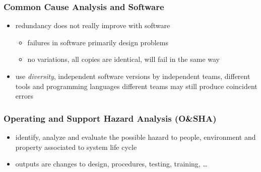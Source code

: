 \documentclass[a4paper, 10pt]{article}
\begin{document}
\subsubsection*{Common Cause Analysis and Software}
\begin{itemize}
    \item redundancy does not really improve with software
    \begin{itemize}
        \item failures in software primarily design problems
        \item no variations, all copies are identical, will fail in the same way
    \end{itemize}
    \item use \emph{diversity}, independent software versions by independent teams, different tools and programming languages \follows different teams may still produce coincident errors
\end{itemize}

\subsubsection*{Operating and Support Hazard Analysis (O\&SHA)}
\begin{itemize}
    \item identify, analyze and evaluate the possible hazard to people, environment and property associated to system life cycle
    \item outputs are changes to design, procedures, testing, training, \dots
\end{itemize}
\end{document}
